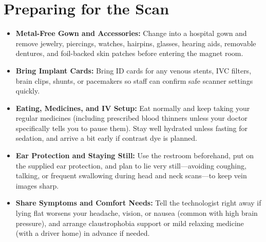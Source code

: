 \section{Preparing for the Scan}
\begin{itemize}
\item \textbf{Metal-Free Gown and Accessories:} Change into a hospital gown and remove jewelry, piercings, watches, hairpins, glasses, hearing aids, removable dentures, and foil-backed skin patches before entering the magnet room.
\item \textbf{Bring Implant Cards:} Bring ID cards for any venous stents, IVC filters, brain clips, shunts, or pacemakers so staff can confirm safe scanner settings quickly.
\item \textbf{Eating, Medicines, and IV Setup:} Eat normally and keep taking your regular medicines (including prescribed blood thinners unless your doctor specifically tells you to pause them). Stay well hydrated unless fasting for sedation, and arrive a bit early if contrast dye is planned.
\item \textbf{Ear Protection and Staying Still:} Use the restroom beforehand, put on the supplied ear protection, and plan to lie very still---avoiding coughing, talking, or frequent swallowing during head and neck scans---to keep vein images sharp.
\item \textbf{Share Symptoms and Comfort Needs:} Tell the technologist right away if lying flat worsens your headache, vision, or nausea (common with high brain pressure), and arrange claustrophobia support or mild relaxing medicine (with a driver home) in advance if needed.
\end{itemize}

